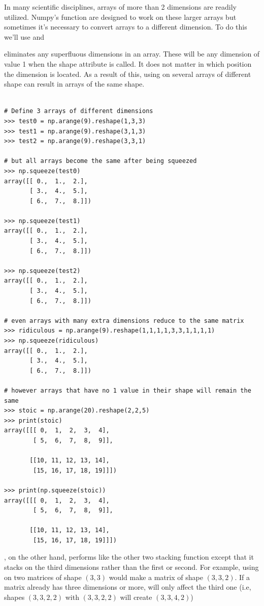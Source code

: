 In many scientific disciplines, arrays of more than 2 dimensions are readily utilized. 
Numpy's function are designed to work on these larger arrays but sometimes it's necessary to convert arrays to a different dimension. 
To do this we'll use  and 

 eliminates any superfluous dimensions in an array. 
These will be any dimension of value 1 when the shape attribute is called. 
It does not matter in which position the dimension is located. 
As a result of this, using  on several arrays of different shape can result in arrays of the same shape.

\begin{lstlisting}

# Define 3 arrays of different dimensions
>>> test0 = np.arange(9).reshape(1,3,3)
>>> test1 = np.arange(9).reshape(3,1,3)
>>> test2 = np.arange(9).reshape(3,3,1)

# but all arrays become the same after being squeezed
>>> np.squeeze(test0)
array([[ 0.,  1.,  2.],
       [ 3.,  4.,  5.],
       [ 6.,  7.,  8.]])

>>> np.squeeze(test1)
array([[ 0.,  1.,  2.],
       [ 3.,  4.,  5.],
       [ 6.,  7.,  8.]])

>>> np.squeeze(test2)
array([[ 0.,  1.,  2.],
       [ 3.,  4.,  5.],
       [ 6.,  7.,  8.]])

# even arrays with many extra dimensions reduce to the same matrix
>>> ridiculous = np.arange(9).reshape(1,1,1,1,3,3,1,1,1,1)
>>> np.squeeze(ridiculous)
array([[ 0.,  1.,  2.],
       [ 3.,  4.,  5.],
       [ 6.,  7.,  8.]])

# however arrays that have no 1 value in their shape will remain the same
>>> stoic = np.arange(20).reshape(2,2,5)
>>> print(stoic)
array([[[ 0,  1,  2,  3,  4],
        [ 5,  6,  7,  8,  9]],

       [[10, 11, 12, 13, 14],
        [15, 16, 17, 18, 19]]])

>>> print(np.squeeze(stoic))
array([[[ 0,  1,  2,  3,  4],
        [ 5,  6,  7,  8,  9]],

       [[10, 11, 12, 13, 14],
        [15, 16, 17, 18, 19]]])

\end{lstlisting} 

, on the other hand, performs like the other two stacking function except that it stacks on the third dimensions rather than the first or second. 
For example, using  on two matrices of shape $(3,3)$ would make a matrix of shape $(3,3,2)$. If a matrix already has three dimensions or more,  will only affect the third one (i.e, shapes $(3,3,2,2)$ with $(3,3,2,2)$ will create $(3,3,4,2)$)

